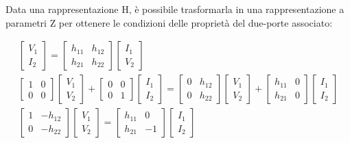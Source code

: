 \documentclass{article}
\numberwithin{equation}{subsection}
\begin{document}
Data una rappresentazione H, è possibile trasformarla in una rappresentazione a parametri Z per ottenere le condizioni delle proprietà del due-porte associato:


\begin{gather*}
    \begin{bmatrix}
        V_1\\I_2
    \end{bmatrix}=\begin{bmatrix}
        h_{11}&h_{12}\\h_{21}&h_{22}
    \end{bmatrix}\begin{bmatrix}
        I_1\\V_2
    \end{bmatrix}\\
    \begin{bmatrix}
        1&0\\0&0
    \end{bmatrix}\begin{bmatrix}
        V_1\\V_2
    \end{bmatrix}+\begin{bmatrix}
        0&0\\0&1
    \end{bmatrix}\begin{bmatrix}
        I_1\\I_2
    \end{bmatrix}=\begin{bmatrix}
        0&h_{12}\\0&h_{22}
    \end{bmatrix}\begin{bmatrix}
        V_1\\V_2
    \end{bmatrix}+\begin{bmatrix}
        h_{11}&0\\h_{21}&0
    \end{bmatrix}\begin{bmatrix}
        I_1\\I_2
    \end{bmatrix}\\
    \begin{bmatrix}
        1&-h_{12}\\0&-h_{22}
    \end{bmatrix}\begin{bmatrix}
        V_1\\V_2
    \end{bmatrix}=\begin{bmatrix}
        h_{11}&0\\h_{21}&-1
    \end{bmatrix}\begin{bmatrix}
        I_1\\I_2
    \end{bmatrix}\\
\end{gather*}
\end{document}
